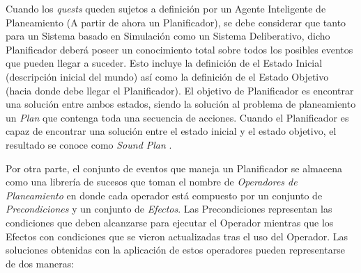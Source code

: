 Cuando los \textit{quests} queden sujetos a definición por un Agente Inteligente de Planeamiento (A partir de ahora un Planificador), se debe considerar que tanto para un Sistema basado en Simulación como un Sistema Deliberativo, dicho Planificador deberá poseer un conocimiento total sobre todos los posibles eventos que pueden llegar a suceder. Esto incluye la definición de el Estado Inicial (descripción inicial del mundo) así como la definición de el Estado Objetivo (hacia donde debe llegar el Planificador). El objetivo de Planificador es encontrar una solución entre ambos estados, siendo la solución al problema de planeamiento un \textit{Plan} que contenga toda una secuencia de acciones. Cuando el Planificador es capaz de encontrar una solución entre el estado inicial y el estado objetivo, el resultado se conoce como \textit{Sound Plan} \cite{cheong2016planning}.

Por otra parte, el conjunto de eventos que maneja un Planificador se almacena como una librería de sucesos que toman el nombre de \textit{Operadores de Planeamiento} en donde cada operador está compuesto por un conjunto de \textit{Precondiciones} y un conjunto de \textit{Efectos}. Las Precondiciones representan las condiciones que deben alcanzarse para ejecutar el Operador mientras que los Efectos con condiciones que se vieron actualizadas tras el uso del Operador. Las soluciones obtenidas con la aplicación de estos operadores pueden representarse de dos maneras: 

